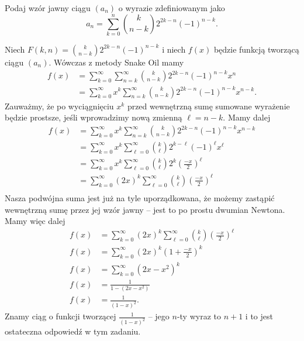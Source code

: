 \documentclass[shortabstract]{imthesis}
\begin{document}
\begin{problem}
    Podaj wzór jawny ciągu $(a_n)$ o wyrazie zdefiniowanym jako
    $$
    a_n = \sum_{k=0}^n {k \choose n-k} 2^{2k-n} (-1)^{n-k}.
    $$
\end{problem}
\begin{solution}
    Niech $F(k, n) = {k \choose n-k} 2^{2k-n} (-1)^{n-k}$ i niech $f(x)$ będzie funkcją tworzącą ciągu $(a_n)$. Wówczas z metody Snake Oil mamy
    \begin{align*}
    f(x) &= \sum_{k=0}^\infty \sum_{n=k}^\infty {k \choose n-k} 2^{2k-n} (-1)^{n-k} x^n \\
    &= \sum_{k=0}^\infty x^k \sum_{n=k}^\infty {k \choose n-k} 2^{2k-n} (-1)^{n-k} x^{n-k}.
    \end{align*}
    Zauważmy, że po wyciągnięciu $x^k$ przed wewnętrzną sumę sumowane wyrażenie będzie prostsze, jeśli wprowadzimy nową zmienną $\ell = n-k$. Mamy dalej
    \begin{align*}
    f(x) &= \sum_{k=0}^\infty x^k \sum_{n=k}^\infty {k \choose n-k} 2^{2k-n} (-1)^{n-k} x^{n-k} \\
    &= \sum_{k=0}^\infty x^k \sum_{\ell=0}^\infty {k \choose \ell} 2^{k-\ell} (-1)^{\ell} x^{\ell} \\
    &= \sum_{k=0}^\infty x^k \sum_{\ell=0}^\infty {k \choose \ell} 2^{k} \left(\frac{-x}{2}\right)^{\ell} \\
    &= \sum_{k=0}^\infty (2x)^k \sum_{\ell=0}^\infty {k \choose \ell} \left(\frac{-x}{2}\right)^{\ell} \\
    \end{align*}
    Nasza podwójna suma jest już na tyle uporządkowana, że możemy zastąpić wewnętrzną sumę przez jej wzór jawny -- jest to po prostu dwumian Newtona. Mamy więc dalej
    \begin{align*}
    f(x) &= \sum_{k=0}^\infty (2x)^k \sum_{\ell=0}^\infty {k \choose \ell} \left(\frac{-x}{2}\right)^{\ell} \\
    f(x) &= \sum_{k=0}^\infty (2x)^k \left(1+\frac{-x}{2}\right)^k \\
    f(x) &= \sum_{k=0}^\infty \left(2x-x^2\right)^k \\
    f(x) &= \frac{1}{1-(2x-x^2)} \\
    f(x) &= \frac{1}{(1-x)^2}.
    \end{align*}
    Znamy ciąg o funkcji tworzącej $\frac{1}{(1-x)^2}$ -- jego $n$-ty wyraz to $n+1$ i to jest ostateczna odpowiedź w tym zadaniu.
\end{solution}
\end{document}
